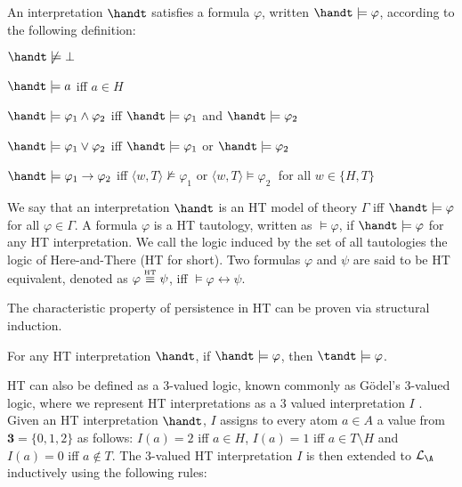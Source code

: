 \begin{definition}[HT satisfaction]
    An interpretation $\handt$ satisfies a formula $\varphi$, written $\handt \models \varphi$, according to the following definition:
    \begin{description}
        \item $\handt \not \models \bot$
        \item $\handt \models a$ iff $a\in H$
        \item $\handt \models \varphi_1 \wedge \varphi_2$ iff $\handt \models \varphi_1$ and  $\handt \models \varphi_2$
        \item $\handt \models \varphi_1 \vee \varphi_2$ iff $\handt \models \varphi_1$ or  $\handt \models \varphi_2$
        \item $\handt \models \varphi_1 \to \varphi_2$ iff $\langle w,T \rangle \not \models \varphi_1$ or  $\langle w,T \rangle \models \varphi_2\;$ for all 
        $w \in \{H,T\}$
    \end{description}
\end{definition}

We say that an interpretation $\handt$ is an HT model of theory
$\Gamma$ iff $\handt \models \varphi$ for all $\varphi \in \Gamma$. A
formula $\varphi$ is a HT tautology, written as $\models \varphi$, if
$\handt \models \varphi$ for any HT interpretation. We call the logic
induced by the set of all tautologies the logic of Here-and-There (HT
for short). Two formulas $\varphi$ and $\psi$ are said to be HT
equivalent, denoted as $\varphi \stackrel{\normalfont\mbox{\tiny HT}}{\equiv} \psi$, iff
$\models \varphi \leftrightarrow \psi$.

The characteristic property of persistence in HT can be proven via
structural induction.

\begin{proposition}[Persistence]
  For any HT interpretation $\handt$, if $\handt \models \varphi$,
  then $\tandt \models \varphi$.
\end{proposition}

HT can also be defined as a 3-valued logic, known commonly as Gödel's
3-valued logic, where we represent HT interpretations as a 3 valued
interpretation $I$ \cite{capeva05a}. Given an HT interpretation
$\handt$, $I$ assigns to every atom $a\in A$ a value from
$\textbf{3}=\{ 0, 1, 2 \}$ as follows: $I(a)=2$ iff $a \in H$,
$I(a)=1$ iff $a \in T \setminus H$ and $I(a)=0$ iff $a \not\in T$. The
3-valued HT interpretation $I$ is then extended to $\mathcal{L}_\A$
inductively using the following rules:


